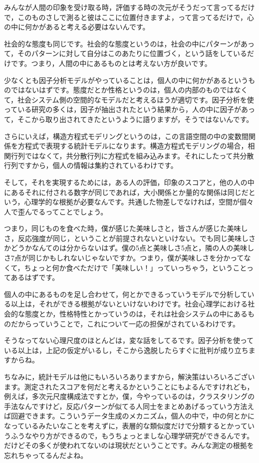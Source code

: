 \documentclass{ltjsbook}
\begin{document}
みんなが人間の印象を受け取る時，評価する時の次元がそうだって言ってるだけで，このものさしで測ると彼はここに位置付きますよ，って言ってるだけで，心の中に何かがあると考える必要はないんです。

社会的な態度も同じです。社会的な態度というのは，社会の中にパターンがあって，そのパターンに対して自分はこのあたりに位置づく，という話をしているだけです。つまり，人間の中にあるものとは考えない方が良いです。

少なくとも因子分析モデルがやっていることは，個人の中に何かがあるというものではないはずです。態度だとか性格というのは，個人の内部のものではなくて，社会システム側の空間的なモデルだと考えるほうが適切です。因子分析を使っている研究の多くは，因子が抽出されたという結果から，人の中に因子があって，そこから取り出されてきたというように語りますが，そうではないんです。

さらにいえば，構造方程式モデリングというのは，この言語空間の中の変数間関係を方程式で表現する統計モデルになります。構造方程式モデリングの場合，相関行列ではなくて，共分散行列に方程式を組み込みます。それにしたって共分散行列ですから，個人の情報は集約されているわけです。

そして，それを実現するためには，ある人の評価，印象のスコアと，他の人の中にあるそれに付される数字が同じであれば，大小関係とか量的な関係は同じだという，心理学的な根拠が必要なんです。共通した物差しでなければ，空間が個々人で歪んでるってことでしょう。

つまり，同じものを食べた時，僕が感じた美味しさと，皆さんが感じた美味しさ，反応強度が同じ，ということが前提されないといけない。でも同じ美味しさかどうかなんてのは分からないはず。僕の5点と美味しさ5点と，隣の人の美味しさ7点が同じかもしれないじゃないですか。つまり，僕が美味しさを分かってなくて，ちょっと何か食べただけで「美味しい！」っていっちゃう，ということってあるはずです。

個人の中にあるものを足し合わせて，何とかできるっていうモデルで分析している以上は，それができる根拠がないといけないわけです。社会心理学における社会的な態度とか，性格特性とかっていうのは，それは社会システムの中にあるものだからっていうことで，これについて一応の担保がされているわけです。

そうなってない心理尺度のほとんどは，変な話をしてるです。因子分析を使っている以上は，上記の仮定がいるし，そこから逸脱したらすぐに批判が成り立ちますからね。

ちなみに，統計モデルは他にもいろいろありますから，解決策はいろいろございます。測定されたスコアを何だと考えるかということにもよるんですけれども，例えば，多次元尺度構成法ですとか，僕，今やっているのは，クラスタリングの手法なんですけど，反応パターンが似てる人同士をまとめあげるっていう方法えば回避できます。こういうデータ生成のメカニズム，個人の中で，中の何とかになっているみたいなことを考えずに，表層的な類似度だけで分類するとかっていうふうなやり方ができるので，もうちょっとましな心理学研究ができるんです。だけどその多くが使われてないのは現状だということです。みんな測定の根拠を忘れちゃってるんだよね。
\end{document}
